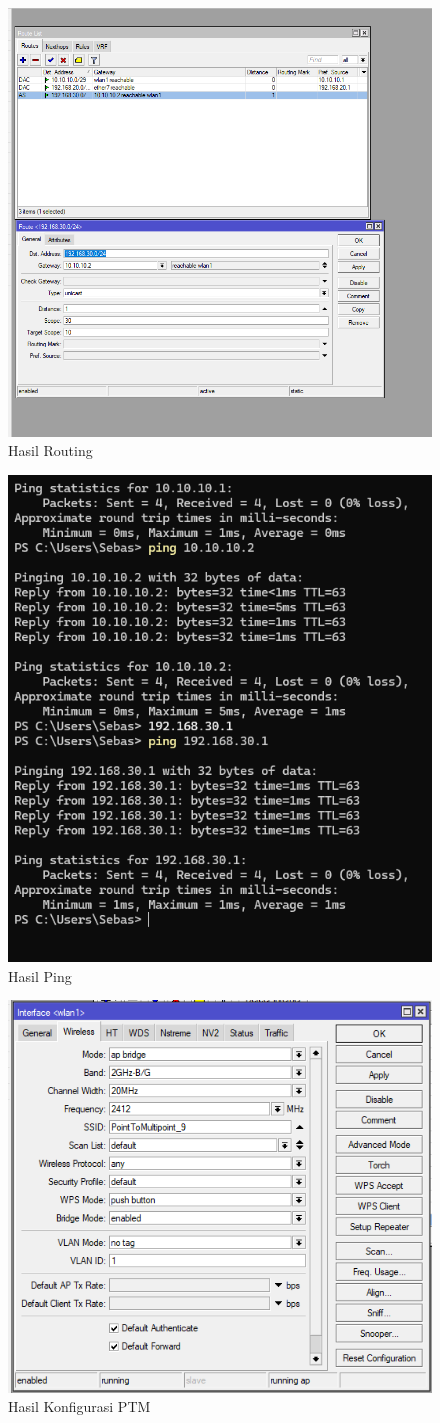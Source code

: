 \begin{figure}[htbp]
    \centering
    \includegraphics[width=0.5\linewidth]{dokum/Laptop 1/routes wlan router a.png} 
    \caption{Hasil Routing}
    \label{fig:ptp-routing}
\end{figure}

\begin{figure}[htbp]
    \centering
    \includegraphics[width=0.5\linewidth]{dokum/Laptop 1/ping ptp.png} 
    \caption{Hasil Ping}
    \label{fig:ptp-ping}
\end{figure}

\begin{figure}[htbp]
    \centering
    \includegraphics[width=0.5\linewidth]{dokum/Laptop 1/jarkom3-ptm-awt interfaces.png} 
    \caption{Hasil Konfigurasi PTM}
    \label{fig:ptm-konfigure}
\end{figure}

